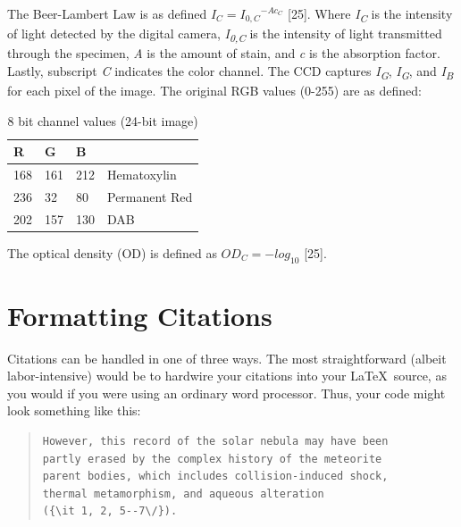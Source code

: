 \documentclass[12pt]{article}
\begin{document}
The Beer-Lambert Law is as defined \begin{math}I_{C} = {I_{0,C}}^{-Ac_{C}}\end{math} [25].
Where \textit{I\textsubscript{C}} is the intensity of light detected by the digital camera, \textit{I\textsubscript{0,C}} is the intensity of light transmitted through the specimen, \textit{A} is the amount of stain, and \textit{c} is the absorption factor. Lastly, subscript \textit{C} indicates the color channel. The CCD captures \textit{I\textsubscript{G}}, \textit{I\textsubscript{G}}, and \textit{I\textsubscript{B}} for each pixel of the image. The original RGB values (0-255) are as defined:



\begin{table}[]
\centering
\caption{8 bit channel values (24-bit image)}
\label{my-label}
\begin{tabular}{|l|l|l|l}
\cline{1-3}
R   & G   & B   &                                    \\ \hline
168 & 161 & 212 & \multicolumn{1}{l|}{Hematoxylin}   \\ \hline
236 & 32  & 80  & \multicolumn{1}{l|}{Permanent Red} \\ \hline
202 & 157 & 130 & \multicolumn{1}{l|}{DAB}           \\ \hline
\end{tabular}
\end{table}


The optical density (OD) is defined as \begin{math}OD_C = -log_10\end{math} [25].





\section*{Formatting Citations}

Citations can be handled in one of three ways.  The most
straightforward (albeit labor-intensive) would be to hardwire your
citations into your \LaTeX\ source, as you would if you were using an
ordinary word processor.  Thus, your code might look something like
this:


\begin{quote}
\begin{verbatim}
However, this record of the solar nebula may have been
partly erased by the complex history of the meteorite
parent bodies, which includes collision-induced shock,
thermal metamorphism, and aqueous alteration
({\it 1, 2, 5--7\/}).
\end{verbatim}
\end{quote}
\end{document}
